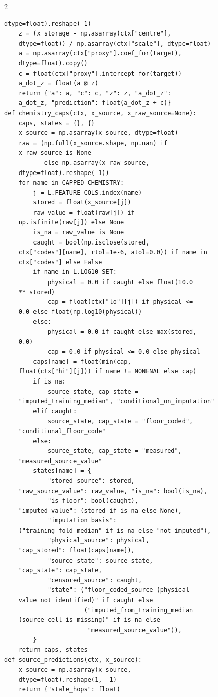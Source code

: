 \begin{multicols}{2}
\begin{Verbatim}[fontsize=\scriptsize]
    dtype=float).reshape(-1)
    z = (x_storage - np.asarray(ctx["centre"],
    dtype=float)) / np.asarray(ctx["scale"], dtype=float)
    a = np.asarray(ctx["proxy"].coef_for(target),
    dtype=float).copy()
    c = float(ctx["proxy"].intercept_for(target))
    a_dot_z = float(a @ z)
    return {"a": a, "c": c, "z": z, "a_dot_z":
    a_dot_z, "prediction": float(a_dot_z + c)}
def chemistry_caps(ctx, x_source, x_raw_source=None):
    caps, states = {}, {}
    x_source = np.asarray(x_source, dtype=float)
    raw = (np.full(x_source.shape, np.nan) if
    x_raw_source is None
           else np.asarray(x_raw_source,
    dtype=float).reshape(-1))
    for name in CAPPED_CHEMISTRY:
        j = L.FEATURE_COLS.index(name)
        stored = float(x_source[j])
        raw_value = float(raw[j]) if
    np.isfinite(raw[j]) else None
        is_na = raw_value is None
        caught = bool(np.isclose(stored,
    ctx["codes"][name], rtol=1e-6, atol=0.0)) if name in
    ctx["codes"] else False
        if name in L.LOG10_SET:
            physical = 0.0 if caught else float(10.0
    ** stored)
            cap = float(ctx["lo"][j]) if physical <=
    0.0 else float(np.log10(physical))
        else:
            physical = 0.0 if caught else max(stored,
    0.0)
            cap = 0.0 if physical <= 0.0 else physical
        caps[name] = float(min(cap,
    float(ctx["hi"][j])) if name != NONENAL else cap)
        if is_na:
            source_state, cap_state =
    "imputed_training_median", "conditional_on_imputation"
        elif caught:
            source_state, cap_state = "floor_coded",
    "conditional_floor_code"
        else:
            source_state, cap_state = "measured",
    "measured_source_value"
        states[name] = {
            "stored_source": stored,
    "raw_source_value": raw_value, "is_na": bool(is_na),
            "is_floor": bool(caught),
    "imputed_value": (stored if is_na else None),
            "imputation_basis":
    ("training_fold_median" if is_na else "not_imputed"),
            "physical_source": physical,
    "cap_stored": float(caps[name]),
            "source_state": source_state,
    "cap_state": cap_state,
            "censored_source": caught,
            "state": ("floor_coded_source (physical
    value not identified)" if caught else
                      ("imputed_from_training_median
    (source cell is missing)" if is_na else
                       "measured_source_value")),
        }
    return caps, states
def source_predictions(ctx, x_source):
    x_source = np.asarray(x_source,
    dtype=float).reshape(1, -1)
    return {"stale_hops": float(

\end{Verbatim}
\end{multicols}
